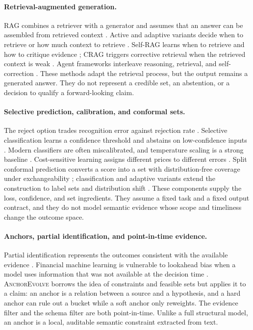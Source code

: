 \documentclass[11pt]{article}
\newcommand{\anchor}{\textsc{AnchorEvolve}}
\begin{document}
\paragraph{Retrieval-augmented generation.}
RAG combines a retriever with a generator and assumes that an answer can be assembled from retrieved context \citep{lewis2020rag}. Active and adaptive variants decide when to retrieve or how much context to retrieve \citep{jiang2023flare,jeong2024adaptiverag}. Self-RAG learns when to retrieve and how to critique evidence \citep{asai2024selfrag}; CRAG triggers corrective retrieval when the retrieved context is weak \citep{yan2024crag}. Agent frameworks interleave reasoning, retrieval, and self-correction \citep{yao2023react,shinn2023reflexion}. These methods adapt the retrieval process, but the output remains a generated answer. They do not represent a credible set, an abstention, or a decision to qualify a forward-looking claim.

\paragraph{Selective prediction, calibration, and conformal sets.}
The reject option trades recognition error against rejection rate \citep{chow1970optimum}. Selective classification learns a confidence threshold and abstains on low-confidence inputs \citep{geifman2017selective}. Modern classifiers are often miscalibrated, and temperature scaling is a strong baseline \citep{guo2017calibration}. Cost-sensitive learning assigns different prices to different errors \citep{elkan2001cost}. Split conformal prediction converts a score into a set with distribution-free coverage under exchangeability \citep{vovk2005algorithmic,angelopoulos2021gentle}; classification and adaptive variants extend the construction to label sets and distribution shift \citep{romano2020classification,gibbs2021adaptive}. These components supply the loss, confidence, and set ingredients. They assume a fixed task and a fixed output contract, and they do not model semantic evidence whose scope and timeliness change the outcome space.

\paragraph{Anchors, partial identification, and point-in-time evidence.}
Partial identification represents the outcomes consistent with the available evidence \citep{manski2003partial}. Financial machine learning is vulnerable to lookahead bias when a model uses information that was not available at the decision time \citep{lopezdeprado2018advances}. \anchor{} borrows the idea of constraints and feasible sets but applies it to a claim: an anchor is a relation between a source and a hypothesis, and a hard anchor can rule out a bucket while a soft anchor only reweights. The evidence filter and the schema filter are both point-in-time. Unlike a full structural model, an anchor is a local, auditable semantic constraint extracted from text.
\end{document}
